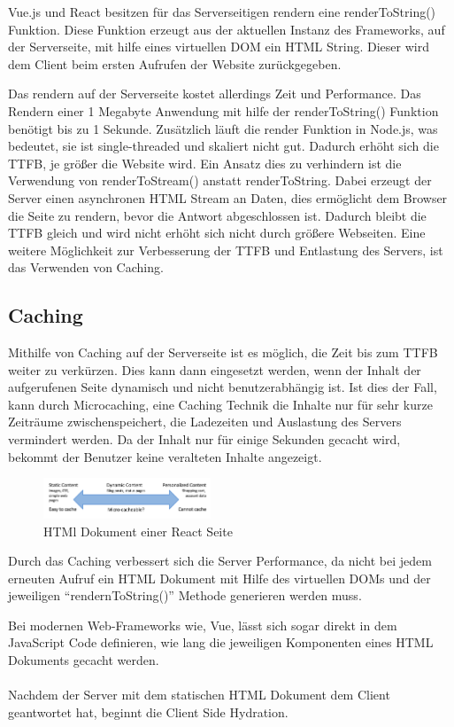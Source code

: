\documentclass[runningheads]{llncs}
\begin{document}
Vue.js und React besitzen für das Serverseitigen rendern eine renderToString() Funktion. 
Diese Funktion erzeugt aus der aktuellen Instanz des Frameworks, 
auf der Serverseite, 
mit hilfe eines virtuellen DOM ein HTML String. 
Dieser wird dem Client beim ersten Aufrufen der Website zurückgegeben.

Das rendern auf der Serverseite kostet allerdings Zeit und Performance. 
Das Rendern einer 1 Megabyte Anwendung mit hilfe der renderToString() 
Funktion benötigt bis zu 1 Sekunde. 
Zusätzlich läuft die render Funktion in Node.js, 
was bedeutet, sie ist single-threaded und skaliert nicht gut. 
Dadurch erhöht sich die TTFB, je größer die Website wird. 
Ein Ansatz dies zu verhindern ist die Verwendung von renderToStream() anstatt renderToString. 
Dabei erzeugt der Server einen asynchronen HTML Stream an Daten, 
dies ermöglicht dem Browser die Seite zu rendern, 
bevor die Antwort abgeschlossen ist. 
Dadurch bleibt die TTFB gleich und 
wird nicht erhöht sich nicht durch größere Webseiten. 
Eine weitere Möglichkeit zur Verbesserung der TTFB und Entlastung des Servers, 
ist das Verwenden von Caching.

\subsection{Caching}
\label{subsec:Caching}
Mithilfe von Caching auf der Serverseite ist es möglich, 
die Zeit bis zum TTFB weiter zu verkürzen. 
Dies kann dann eingesetzt werden, 
wenn der Inhalt der aufgerufenen Seite dynamisch und nicht benutzerabhängig ist. 
Ist dies der Fall, kann durch Microcaching, 
eine Caching Technik die Inhalte nur für sehr kurze Zeiträume zwischenspeichert, 
die Ladezeiten und Auslastung des Servers vermindert werden. 
Da der Inhalt nur für einige Sekunden gecacht wird, 
bekommt der Benutzer keine veralteten Inhalte angezeigt. 
\begin{figure}[h]
  \centering
  \includegraphics[width=5cm]{images/caching}
  \caption{HTMl Dokument einer React Seite}
\end{figure}
Durch das Caching verbessert sich die Server Performance, 
da nicht bei jedem erneuten Aufruf ein HTML Dokument mit Hilfe des virtuellen DOMs und 
der jeweiligen “rendernToString()” Methode generieren werden muss. 

Bei modernen Web-Frameworks wie, Vue, 
lässt sich sogar direkt in dem JavaScript Code definieren, 
wie lang die jeweiligen Komponenten eines HTML Dokuments gecacht werden. 
\\
\\
Nachdem der Server mit dem statischen HTML Dokument dem Client geantwortet hat, 
beginnt die Client Side Hydration.
\end{document}
